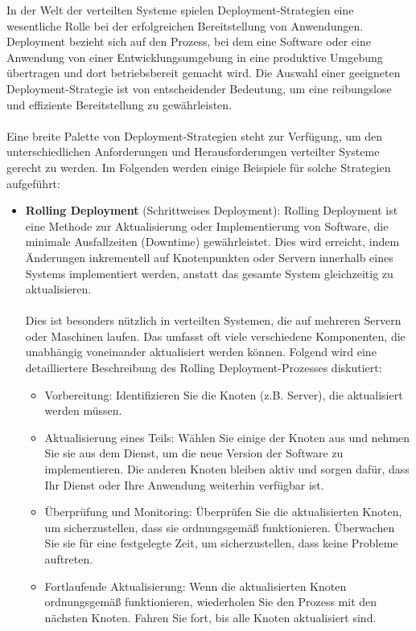 \documentclass[../vs-script-first-v01.tex]{subfiles}
\begin{document}
In der Welt der verteilten Systeme spielen Deployment-Strategien eine wesentliche Rolle bei der erfolgreichen Bereitstellung von Anwendungen. Deployment bezieht sich auf den Prozess, bei dem eine Software oder eine Anwendung von einer Entwicklungsumgebung in eine produktive Umgebung übertragen und dort betriebsbereit gemacht wird. Die Auswahl einer geeigneten Deployment-Strategie ist von entscheidender Bedeutung, um eine reibungslose und effiziente Bereitstellung zu gewährleisten.
\\\\
Eine breite Palette von Deployment-Strategien steht zur Verfügung, um den unterschiedlichen Anforderungen und Herausforderungen verteilter Systeme gerecht zu werden. Im Folgenden werden einige Beispiele für solche Strategien aufgeführt:
\begin{itemize} 
\item \textbf{Rolling Deployment} (Schrittweises Deployment):
Rolling Deployment ist eine Methode zur Aktualisierung oder Implementierung von Software, die minimale Ausfallzeiten (Downtime) gewährleistet. Dies wird erreicht, indem Änderungen inkrementell auf Knotenpunkten oder Servern innerhalb eines Systems implementiert werden, anstatt das gesamte System gleichzeitig zu aktualisieren.
\\\\
Dies ist besonders nützlich in verteilten Systemen, die auf mehreren Servern oder Maschinen laufen. Das umfasst oft viele verschiedene Komponenten, die unabhängig voneinander aktualisiert werden können.
Folgend wird eine detailliertere Beschreibung des Rolling Deployment-Prozesses diskutiert:
\begin{itemize} 
\item Vorbereitung: Identifizieren Sie die Knoten (z.B. Server), die aktualisiert werden müssen.
\item Aktualisierung eines Teils: Wählen Sie einige der Knoten aus und nehmen Sie sie aus dem Dienst, um die neue Version der Software zu implementieren. Die anderen Knoten bleiben aktiv und sorgen dafür, dass Ihr Dienst oder Ihre Anwendung weiterhin verfügbar ist.
\item Überprüfung und Monitoring: Überprüfen Sie die aktualisierten Knoten, um sicherzustellen, dass sie ordnungsgemäß funktionieren. Überwachen Sie sie für eine festgelegte Zeit, um sicherzustellen, dass keine Probleme auftreten.
\item Fortlaufende Aktualisierung: Wenn die aktualisierten Knoten ordnungsgemäß funktionieren, wiederholen Sie den Prozess mit den nächsten Knoten. Fahren Sie fort, bis alle Knoten aktualisiert sind.

\end{itemize}
\end{itemize}
\end{document}
